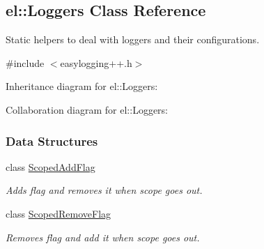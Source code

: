 \hypertarget{a00049}{}\subsection{el\+:\+:Loggers Class Reference}
\label{a00049}


Static helpers to deal with loggers and their configurations.  




{\ttfamily \#include $<$easylogging++.\+h$>$}



Inheritance diagram for el\+:\+:Loggers\+:


Collaboration diagram for el\+:\+:Loggers\+:
\subsubsection*{Data Structures}
\begin{DoxyCompactItemize}
\item 
class \hyperlink{a00078}{Scoped\+Add\+Flag}
\begin{DoxyCompactList}\small\item\em Adds flag and removes it when scope goes out. \end{DoxyCompactList}\item 
class \hyperlink{a00079}{Scoped\+Remove\+Flag}
\begin{DoxyCompactList}\small\item\em Removes flag and add it when scope goes out. \end{DoxyCompactList}\end{DoxyCompactItemize}
